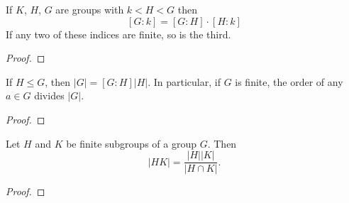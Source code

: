 \documentclass[11pt,a4paper]{article}
\begin{document}
\begin{teo}
    If $K$, $H$, $G$ are groups  with $k<H<G$ then
\[
[G: k]=[G: H] \cdot[H: k]
\]
If any two of these indices are finite, so is the third.
\end{teo}


\begin{proof}
    
\end{proof}


\begin{cor}
    If \( H \leq G \), then \( |G| = [G : H] |H| \). 
In particular, if \( G \) is finite, the order of  any \( a \in G \) divides \( |G| \).
\end{cor}

\begin{proof}
    
\end{proof}


\begin{teo}
    Let \(H\) and \(K\) be finite subgroups of a group \(G\). Then \[|HK| =  \frac{|H||K|}{|H\cap K|}.\]
\end{teo}


\begin{prop}
    
\end{prop}

\begin{proof}
    
\end{proof}


\begin{prop}
    
\end{prop}
\end{document}
